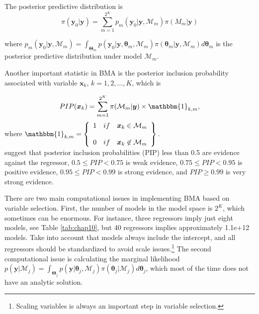 The posterior predictive distribution is
\begin{equation*}
	\pi(\bm{y}_0|\bm{y})= \sum_{m=1}^{2^K}p_m(\bm{y}_0|\bm{y},\mathcal{M}_m) \pi(M_m|\bm{y})
\end{equation*}

where $p_m(\bm{y}_0|\bm{y},\mathcal{M}_m)=\int_{\bm{\Theta}_m} p(\bm{y}_0|\bm{y},\bm{\theta}_m,\mathcal{M}_m)\pi(\bm{\theta}_m |\bm{y}, \mathcal{M}_m) d\bm{\theta}_{m}$ is the posterior predictive distribution under model $\mathcal{M}_m$. 

Another important statistic in BMA is the posterior inclusion probability associated with variable $\bm{x}_k$, $k=1,2,\dots,K$, which is

\begin{equation*}
	PIP(\bm{x}_k)=\sum_{m=1}^{2^K}\pi(\mathcal{M}_m|\bm{y})\times \mathbbm{1}_{k,m},
\end{equation*}
where
$\mathbbm{1}_{k,m}= \left\{ \begin{array}{lcc}
	1&   if  & \bm{x}_{k}\in \mathcal{M}_m \\
	\\ 0 &  if & \bm{x}_{k}\not \in \mathcal{M}_m
\end{array}
\right\}.$\\

\cite{Kass1995} suggest that posterior inclusion probabilities (PIP) less than 0.5 are evidence against the regressor, $0.5\leq PIP<0.75$ is weak evidence, $0.75\leq PIP<0.95$ is positive evidence, $0.95\leq PIP<0.99$ is strong evidence, and $PIP\geq 0.99$ is very strong evidence.

There are two main computational issues in implementing BMA based on variable selection. First, the number of models in the model space is $2^K$, which sometimes can be enormous. For instance, three regressors imply just eight models, see Table \ref{tab:chap10}, but 40 regressors implies approximately  1.1e+12 models. Take into account that models always include the intercept, and all regressors should be standardized to avoid scale issues.\footnote{Scaling variables is always an important step in variable selection.} The second computational issue is calculating the marginal likelihood $p(\bm{y} | \mathcal{M}_j)=\int_{\bm{\Theta}_j} p(\bm{y}| \bm{\theta}_j,\mathcal{M}_j)\pi(\bm{\theta}_j | \mathcal{M}_j) d\bm{\theta}_{j}$, which most of the time does not have an analytic solution. 

